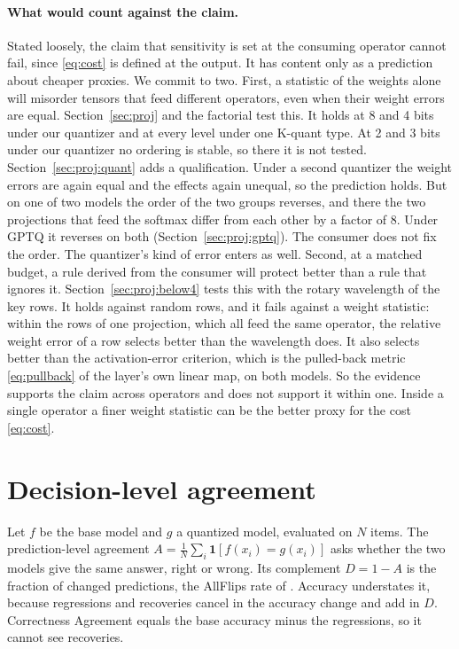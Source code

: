 \documentclass[journal]{IEEEtran}
\begin{document}
\paragraph{What would count against the claim.} Stated loosely, the claim that sensitivity
is set at the consuming operator cannot fail, since \eqref{eq:cost} is defined at the output. It
has content only as a prediction about cheaper proxies. We commit to two. First, a statistic of
the weights alone will misorder tensors that feed different operators, even when their weight
errors are equal. Section~\ref{sec:proj} and the factorial test this. It holds at 8 and 4 bits
under our quantizer and at every level under one K-quant type. At 2 and 3 bits under our
quantizer no ordering is stable, so there it is not tested. Section~\ref{sec:proj:quant} adds a
qualification. Under a second quantizer the weight errors are again equal and the
effects again unequal, so the prediction holds. But on one of two models the order of the two
groups reverses, and there the two projections that feed the softmax differ from each other by a
factor of 8. Under GPTQ it reverses on both (Section~\ref{sec:proj:gptq}). The consumer
does not fix the order. The quantizer's kind of error enters as well. Second, at a
matched budget, a rule derived from the consumer will protect better than a rule that ignores it.
Section~\ref{sec:proj:below4} tests this with the rotary wavelength of the key rows. It holds
against random rows, and it fails against a weight statistic: within the rows of one projection,
which all feed the same operator, the relative weight error of a row selects better than the
wavelength does. It also selects better than the activation-error criterion, which is the
pulled-back metric \eqref{eq:pullback} of the layer's own linear map, on both models. So the evidence supports the claim across operators and does not support it
within one. Inside a single operator a finer weight statistic can be the better proxy for the
cost \eqref{eq:cost}.

\section{Decision-level agreement}\label{sec:agree}

Let $f$ be the base model and $g$ a quantized model, evaluated on $N$ items. The prediction-level
agreement $A = \frac{1}{N}\sum_i \mathbf{1}[f(x_i)=g(x_i)]$ asks whether the two models give the
same answer, right or wrong. Its complement $D = 1-A$ is the fraction of changed predictions, the
AllFlips rate of \citet{dutta2024accuracy}. Accuracy understates it, because regressions and
recoveries cancel in the accuracy change and add in $D$. Correctness Agreement
\citep{rababah2026illusion} equals the base accuracy minus the regressions, so it cannot see
recoveries.
\end{document}
